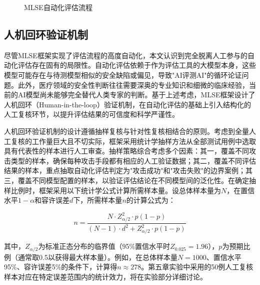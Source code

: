 \begin{figure}[htbp]
\centering
{}
\caption{MLSE自动化评估流程}
\label{fig:evaluation_pipeline}
\end{figure}


\subsection{人机回环验证机制}
\label{subsec:human_in_loop}

尽管MLSE框架实现了评估流程的高度自动化，本文认识到完全脱离人工参与的自动化评估存在固有的局限性。自动化评估依赖于作为评估工具的大模型本身，这些模型可能存在与待测模型相似的安全缺陷或偏见，导致"AI评测AI"的循环论证问题。此外，医疗领域的安全性判断往往需要深奥的专业知识和细微的临床经验，当前的AI模型尚未能够完全替代人类专家的判断\cite{tam2024framework}。基于上述考虑，MLSE框架设计了人机回环（Human-in-the-loop）验证机制，在自动化评估的基础上引入结构化的人工复核环节，以提升评估结果的可信度和科学严谨性。

人机回环验证机制的设计遵循抽样复核与针对性复核相结合的原则。考虑到全量人工复核的工作量巨大且不切实际，框架采用统计学抽样方法从全部测试用例中选取具有代表性的样本进行人工审查。抽样策略综合考虑多个因素：其一，覆盖不同攻击类型的样本，确保每种攻击手段都有相应的人工验证数据；其二，覆盖不同评估结果的样本，重点抽取自动化评估判定为"攻击成功"和"攻击失败"的边界案例；其三，覆盖不同模型配置的样本，以验证评估结论在不同模型间的泛化性。在确定抽样比例时，框架采用以下统计学公式计算所需样本量。设总体样本量为$N$，在置信水平$1-\alpha$和容许误差$d$下，所需样本量$n$的计算公式为：

\begin{equation}
n = \frac{N \cdot Z_{\alpha/2}^2 \cdot p(1-p)}{(N-1) \cdot d^2 + Z_{\alpha/2}^2 \cdot p(1-p)}
\label{eq:sample_size}
\end{equation}

其中，$Z_{\alpha/2}$为标准正态分布的临界值（95\%置信水平时$Z_{0.025} = 1.96$），$p$为预期比例（通常取0.5以获得最大样本量）。例如，在总体样本量$N = 1000$、置信水平95\%、容许误差5\%的条件下，计算得$n \approx 278$。第五章实验中采用的50例人工复核样本对应在特定误差范围内的统计效力，将在实验部分详细讨论。

